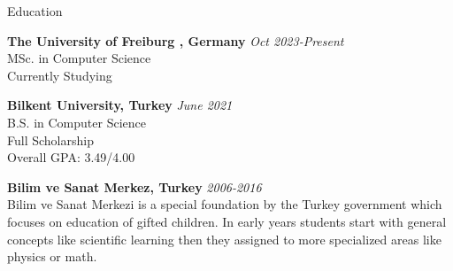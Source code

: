\documentclass{resume} %
\begin{document}

\begin{rSection}{Education}

{\bf  The University of Freiburg , Germany} \hfill {\em Oct 2023-Present} \\
MSc. in Computer Science \\
Currently Studying

{\bf Bilkent University, Turkey} \hfill {\em June 2021} \\ 
B.S. in Computer Science \\
Full Scholarship \\
Overall GPA: 3.49/4.00

{\bf Bilim ve Sanat Merkez, Turkey} \hfill {\em 2006-2016} \\ 
Bilim ve Sanat Merkezi is a special foundation by the Turkey government which focuses on education of gifted children. In early years students start with general concepts like scientific learning then they assigned to more specialized areas like physics or math.

\end{rSection}

\end{document}

